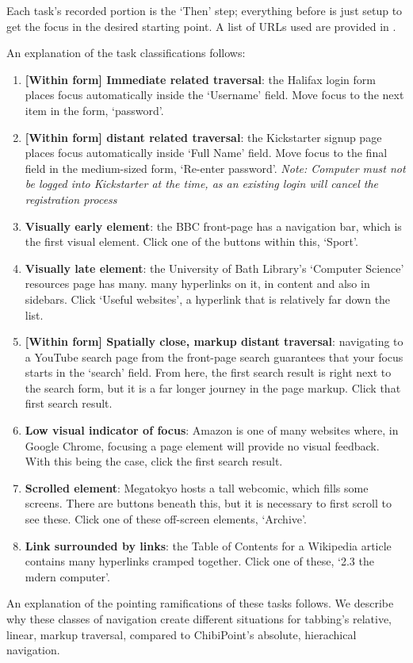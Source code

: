 \documentclass[11pt,openright,a4paper]{report}
\begin{document}
Each task's recorded portion is the `Then' step; everything before is just setup to get the focus in the desired starting point. A list of URLs used are provided in .

An explanation of the task classifications follows:

\newcommand{\TaskDef}[2]{\item \textbf{#1}: #2}

\begin{enumerate}
	\TaskDef{[Within form] Immediate related traversal}{the Halifax login form places focus automatically inside the `Username' field. Move focus to the next item in the form, `password'.}
	\TaskDef{[Within form] distant related traversal}{the Kickstarter signup page places focus automatically inside `Full Name' field. Move focus to the final field in the medium-sized form, `Re-enter password'. \textit{Note: Computer must not be logged into Kickstarter at the time, as an existing login will cancel the registration process}}
	\TaskDef{Visually early element}{the BBC front-page has a navigation bar, which is the first visual element. Click one of the buttons within this, `Sport'.}
	\TaskDef{Visually late element}{the University of Bath Library's `Computer Science' resources page has many. 
	many hyperlinks on it, in content and also in sidebars. Click `Useful websites', a hyperlink that is relatively far down the list.}
	\TaskDef{[Within form] Spatially close, markup distant traversal}{navigating to a YouTube search page from the front-page search guarantees that your focus starts in the `search' field. From here, the first search result is right next to the search form, but it is a far longer journey in the page markup. Click that first search result.}
	\TaskDef{Low visual indicator of focus}{Amazon is one of many websites where, in Google Chrome, focusing a page element will provide no visual feedback. With this being the case, click the first search result.}
	\TaskDef{Scrolled element}{Megatokyo hosts a tall webcomic, which fills some screens. There are buttons beneath this, but it is necessary to first scroll to see these. Click one of these off-screen elements, `Archive'.}
	\TaskDef{Link surrounded by links}{the Table of Contents for a Wikipedia article contains many hyperlinks cramped together. Click one of these, `2.3 the mdern computer'.}
\end{enumerate}

An explanation of the pointing ramifications of these tasks follows. We describe why these classes of navigation create different situations for tabbing's relative, linear, markup traversal, compared to ChibiPoint's absolute, hierachical navigation.
\end{document}
